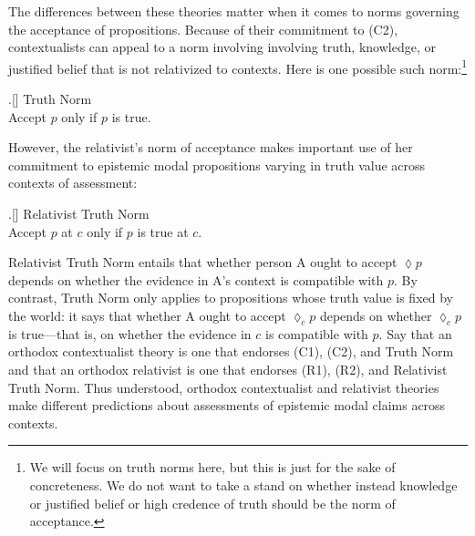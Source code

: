 \documentclass[11pt]{article}
\begin{document}
\begin{doublespace}
The differences between these theories matter when it comes to norms governing the acceptance of propositions. Because of their commitment to (C2), contextualists can appeal to a norm involving  involving truth, knowledge, or justified belief that is not relativized to contexts. Here is one possible such norm:\footnote{We will focus on truth norms here, but this is just for the sake of concreteness. We do not want to take a stand on whether instead knowledge or justified belief or high credence of truth should be the norm of acceptance.}

\ex.[]  {\sc Truth Norm}\\
	{Accept $p$ only if $p$ is true.}

However, the relativist's norm of acceptance makes important use of her commitment to epistemic modal propositions varying in truth value across contexts of assessment:

\ex.[] {\sc Relativist Truth Norm} \\
	{Accept $p$ at $c$ only if $p$ is true at $c$.}

{\sc Relativist Truth Norm} entails that whether person A ought to accept $\lozenge p$ depends on whether the evidence in A's context is compatible with $p$. By contrast, {\sc Truth Norm} only applies to propositions whose truth value is fixed by the world: it says that whether A ought to accept $\lozenge_c p$ depends on whether $\lozenge_c p$ is true---that is, on whether the evidence in $c$ is compatible with $p$. Say that an orthodox contextualist theory is one that endorses (C1), (C2), and {\sc Truth Norm} and that an orthodox relativist is one that endorses (R1), (R2), and {\sc Relativist Truth Norm}. Thus understood, orthodox contextualist and relativist theories make different predictions about assessments of epistemic modal claims across contexts.



\end{doublespace}
\end{document}
